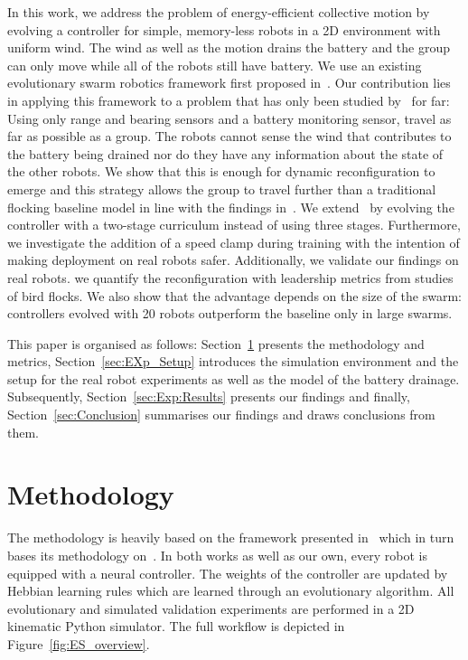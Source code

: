 \documentclass[runningheads]{llncs}
\begin{document}
In this work, we address the problem of energy-efficient collective motion by evolving a controller for simple, memory-less robots in a 2D environment with uniform wind. The wind as well as the motion drains the battery and the group can only move while all of the robots still have battery.
We use an existing evolutionary swarm robotics framework first proposed in~\cite{vandiggelen2025emergentheterogeneousswarmcontrol}. Our contribution lies in applying this framework to a problem that has only been studied by~\cite{mahdavi2026energy} for far: Using only range and bearing sensors and a battery monitoring sensor, travel as far as possible as a group. The robots cannot sense the wind that contributes to the battery being drained nor do they have any information about the state of the other robots. We show that this is enough for dynamic reconfiguration to emerge and this strategy allows the group to travel further than a traditional flocking baseline model in line with the findings in~\cite{mahdavi2026energy}. We extend~\cite{mahdavi2026energy} by evolving the controller with a two-stage curriculum instead of using three stages. Furthermore, we investigate the addition of a speed clamp during training with the intention of making deployment on real robots safer. Additionally, we validate our findings on real robots. we quantify the reconfiguration with leadership metrics from studies of bird flocks. We also show that the advantage depends on the size of the swarm: controllers evolved with 20 robots outperform the baseline only in large swarms.  


This paper is organised as follows: Section~\ref{sec:methodology} presents the methodology and metrics, Section~\ref{sec:EXp_Setup} introduces the simulation environment and the setup for the real robot experiments as well as the model of the battery drainage. Subsequently, Section~\ref{sec:Exp:Results} presents our findings and finally, Section~\ref{sec:Conclusion} summarises our findings and draws conclusions from them.


\section{Methodology}
\label{sec:methodology}
The methodology is heavily based on the framework presented in~\cite{mahdavi2026energy} which in turn bases its methodology on~\cite{vandiggelen2025emergentheterogeneousswarmcontrol}. In both works as well as our own, every robot is equipped with a neural controller. The weights of the controller are updated by Hebbian learning rules which are learned through an evolutionary algorithm. All evolutionary and simulated validation experiments are performed in a 2D kinematic Python simulator.
The full workflow is depicted in Figure~\ref{fig:ES_overview}.
\end{document}
